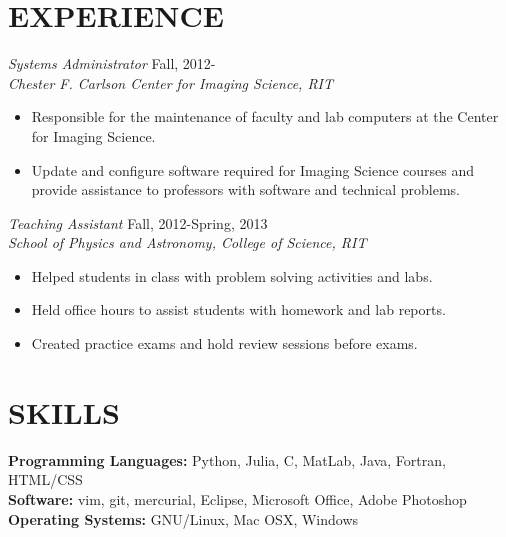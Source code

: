 \documentclass[margin]{res}
\begin{document}
\begin{resume}
\section{EXPERIENCE}

  {\sl Systems Administrator} \hfill            Fall, 2012- \\
  {\sl Chester F. Carlson Center for Imaging Science, RIT}\\
  \begin{itemize}
    \item Responsible for the maintenance of faculty and lab computers
      at the Center for Imaging Science.
    \item Update and configure software required for Imaging Science courses
      and provide assistance to professors with software and technical problems.
  \end{itemize}

  {\sl Teaching Assistant} \hfill            Fall, 2012-Spring, 2013 \\
  {\sl School of Physics and Astronomy, College of Science, RIT}\\
  \begin{itemize}
    \item Helped students in class with problem solving activities and labs.
    \item Held office hours to assist students with homework and lab reports.
    \item Created practice exams and hold review sessions before exams.
  \end{itemize}

\section{SKILLS}
\textbf{Programming Languages:} Python, Julia, C, MatLab, Java, Fortran, HTML/CSS \\
\textbf{Software:} vim, git, mercurial, Eclipse, Microsoft Office, Adobe Photoshop \\
\textbf{Operating Systems:} GNU/Linux, Mac OSX, Windows
 

                 
            
                 

\end{resume}
\end{document}
